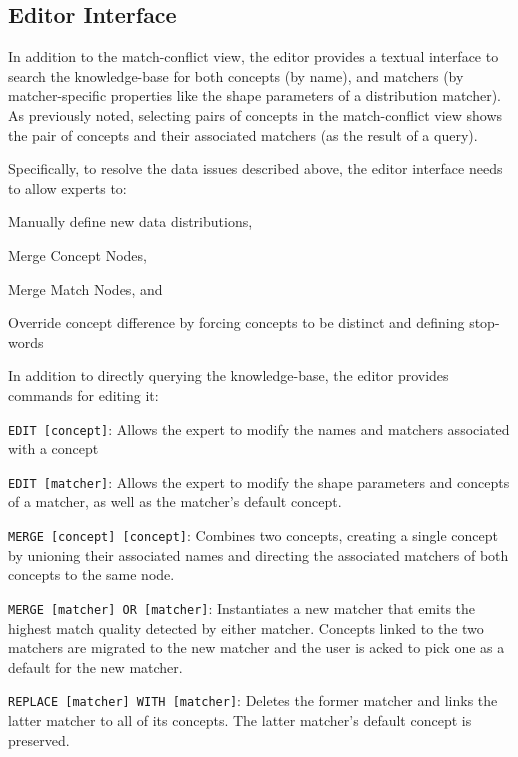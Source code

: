 

\subsection{Editor Interface}
In addition to the match-conflict view, the \systemname editor provides a textual interface to search the knowledge-base for both concepts (by name), and matchers (by matcher-specific properties like the shape parameters of a distribution matcher).  
As previously noted, selecting pairs of concepts in the match-conflict view shows the pair of concepts and their associated matchers (as the result of a query).

Specifically, to resolve the data issues described above, the editor interface needs to allow experts to:
\begin{enumerate*}
	\item Manually define new data distributions, 
	\item Merge Concept Nodes, 
	\item Merge Match Nodes, and
	\item Override concept difference by forcing concepts to be distinct and defining stop-words
\end{enumerate*}


In addition to directly querying the knowledge-base, the editor provides commands for editing it:

\newcommand{\lokicommand}[2]{\smallskip\noindent \texttt{#1}: #2}

\lokicommand{EDIT [concept]}{
	Allows the expert to modify the names and matchers associated with a concept
}

\lokicommand{EDIT [matcher]}{
Allows the expert to modify the shape parameters and concepts of a matcher, as well as the matcher's default concept.
}

\lokicommand{MERGE [concept] [concept]}{
	Combines two concepts, creating a single concept by unioning their associated names and directing the associated matchers of both concepts to the same node.
}

\lokicommand{MERGE [matcher] OR [matcher]}{
	Instantiates a new matcher that emits the highest match quality detected by either matcher.  
	Concepts linked to the two matchers are migrated to the new matcher and the user is acked to pick one as a default for the new matcher.
}

\lokicommand{REPLACE [matcher] WITH [matcher]}{
	Deletes the former matcher and links the latter matcher to all of its concepts.  The latter matcher's default concept is preserved.
}



